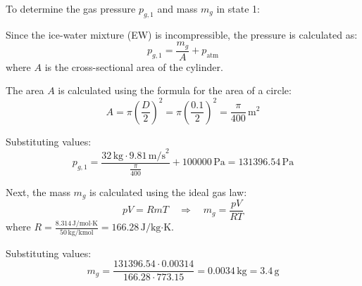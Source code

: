 To determine the gas pressure \( p_{g,1} \) and mass \( m_g \) in state 1:  

Since the ice-water mixture (EW) is incompressible, the pressure is calculated as:  
\[
p_{g,1} = \frac{m_g}{A} + p_{\text{atm}}
\]  
where \( A \) is the cross-sectional area of the cylinder.  

The area \( A \) is calculated using the formula for the area of a circle:  
\[
A = \pi \left( \frac{D}{2} \right)^2 = \pi \left( \frac{0.1}{2} \right)^2 = \frac{\pi}{400} \, \text{m}^2
\]  

Substituting values:  
\[
p_{g,1} = \frac{32 \, \text{kg} \cdot 9.81 \, \text{m/s}^2}{\frac{\pi}{400}} + 100000 \, \text{Pa} = 131396.54 \, \text{Pa}
\]  

Next, the mass \( m_g \) is calculated using the ideal gas law:  
\[
p V = R m T \quad \Rightarrow \quad m_g = \frac{p V}{R T}
\]  
where \( R = \frac{8.314 \, \text{J/mol·K}}{50 \, \text{kg/kmol}} = 166.28 \, \text{J/kg·K} \).  

Substituting values:  
\[
m_g = \frac{131396.54 \cdot 0.00314}{166.28 \cdot 773.15} = 0.0034 \, \text{kg} = 3.4 \, \text{g}
\]